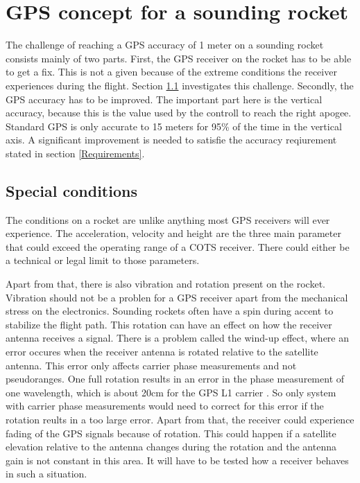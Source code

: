 \chapter{GPS concept for a sounding rocket}

The challenge of reaching a GPS accuracy of 1 meter on a sounding rocket consists mainly of two parts.
First, the GPS receiver on the rocket has to be able to get a fix.
This is not a given because of the extreme conditions the receiver experiences during the flight.
Section \ref{Special_conditions} investigates this challenge.
Secondly, the GPS accuracy has to be improved.
The important part here is the vertical accuracy, because this is the value used by the controll to reach the right apogee.
Standard GPS is only accurate to 15 meters for 95\% of the time in the vertical axis.
A significant improvement is needed to satisfie the accuracy reqiurement stated in section \ref{Requirements}.


\section{Special conditions}\label{Special_conditions}

The conditions on a rocket are unlike anything most GPS receivers will ever experience.
The acceleration, velocity and height are the three main parameter that could exceed the operating range of a COTS receiver.
There could either be a technical or legal limit to those parameters.

Apart from that, there is also vibration and rotation present on the rocket.
Vibration should not be a problen for a GPS receiver apart from the mechanical stress on the electronics.
Sounding rockets often have a spin during accent to stabilize the flight path.
This rotation can have an effect on how the receiver antenna receives a signal.
There is a problem called the wind-up effect, where an error occures when the receiver antenna is rotated relative to the satellite antenna.
This error only affects carrier phase measurements and not pseudoranges.
One full rotation results in an error in the phase measurement of one wavelength, which is about 20cm for the GPS L1 carrier \cite{Wind_up}. 
So only system with carrier phase measurements would need to correct for this error if the rotation reults in a too large error.
Apart from that, the receiver could experience fading of the GPS signals because of rotation.
This could happen if a satellite elevation relative to the antenna changes during the rotation and the antenna gain is not constant in this area.
It will have to be tested how a receiver behaves in such a situation.

